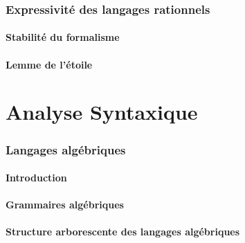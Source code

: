 \section{Expressivité des langages rationnels}
 
\subsection{Stabilité du formalisme}



 
\subsection{Lemme de l'étoile}




 
 
\part{Analyse Syntaxique}
 
 
\section{Langages algébriques}
 
\subsection{Introduction}


 
\subsection{Grammaires algébriques}





 
\subsection{Structure arborescente des langages algébriques}




 

